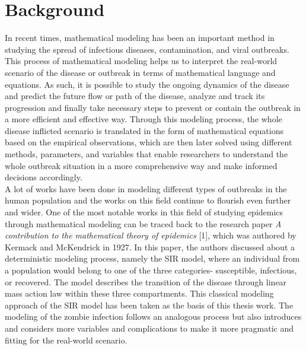 \section{Background}

In recent times, mathematical modeling has been an important method in studying the spread of infectious diseases, contamination, and viral outbreaks. This process of mathematical modeling helps us to interpret the real-world scenario of the disease or outbreak in terms of mathematical language and equations. As such, it is possible to study the ongoing dynamics of the disease and predict the future flow or path of the disease, analyze and track its progression and finally take necessary steps to prevent or contain the outbreak in a more efficient and effective way. Through this modeling process, the whole disease inflicted scenario is translated in the form of mathematical equations based on the empirical observations, which are then later solved using different methods, parameters, and variables that enable researchers to understand the whole outbreak situation in a more comprehensive way and make informed decisions accordingly. \\


A lot of works have been done in modeling different types of outbreaks in the human population and the works on this field continue to flourish even further and wider. One of the most notable works in this field of studying epidemics through mathematical modeling can be traced back to the research paper \emph{A contribution to the mathematical theory of epidemics} [1], which was authored by Kermack and McKendrick in 1927. In this paper, the authors discussed about a deterministic modeling process, namely the SIR model, where an individual from a population would belong to one of the three categories- susceptible, infectious, or recovered. The model describes the transition of the disease through linear mass action law within these three compartments. This classical modeling approach of the SIR model has been taken as the basis of this thesis work. The modeling of the zombie infection follows an analogous process but also introduces and considers more variables and complications to make it more pragmatic and fitting for the real-world scenario. \\

